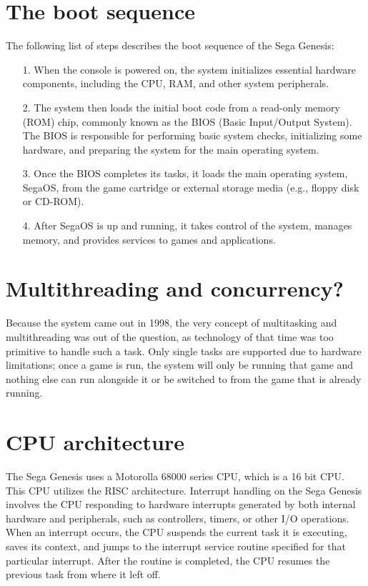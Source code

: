 \documentclass[12pt]{article}
\begin{document}
\section{The boot sequence}
The following list of steps describes the boot sequence of the Sega Genesis:

\begin{itemize}
  \item[1.] When the console is powered on, the system initializes essential hardware components, including the CPU, RAM, and other system peripherals.
  \item[2.] The system then loads the initial boot code from a read-only memory (ROM) chip, commonly known as the BIOS (Basic Input/Output System). The BIOS is responsible for performing basic system checks, initializing some hardware, and preparing the system for the main operating system.
  \item[3.] Once the BIOS completes its tasks, it loads the main operating system, SegaOS, from the game cartridge or external storage media (e.g., floppy disk or CD-ROM).
  \item[4.] After SegaOS is up and running, it takes control of the system, manages memory, and provides services to games and applications.
\end{itemize}
\newpage
\section{Multithreading and concurrency?}
Because the system came out in 1998, the very concept of multitasking and multithreading was out of the question, as technology of that time was too primitive to handle such a task. Only single tasks are supported due to hardware limitations; once a game is run, the system will only be running that game and nothing else can run alongside it or be switched to from the game that is already running.

\section{CPU architecture}
The Sega Genesis uses a Motorolla 68000 series CPU, which is a 16 bit CPU. This CPU utilizes the RISC architecture. Interrupt handling on the Sega Genesis involves the CPU responding to hardware interrupts generated by both internal hardware and peripherals, such as controllers, timers, or other I/O operations. When an interrupt occurs, the CPU suspends the current task it is executing, saves its context, and jumps to the interrupt service routine specified for that particular interrupt. After the routine is completed, the CPU resumes the previous task from where it left off.
\end{document}
